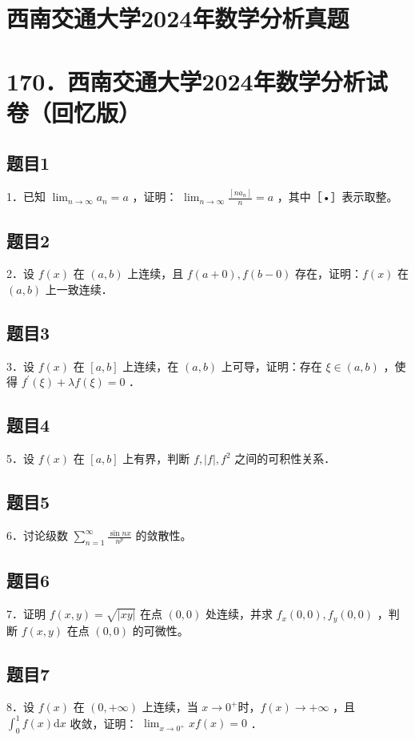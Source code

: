 \documentclass{article}
\begin{document}
\section*{西南交通大学2024年数学分析真题}
\section*{170．西南交通大学2024年数学分析试卷（回忆版）}

\subsection{题目1}
1．已知 \(\lim _{n \rightarrow \infty} a_{n}=a\) ，证明： \(\lim _{n \rightarrow \infty} \frac{\left[n a_{n}\right]}{n}=a\) ，其中［•］表示取整。

\subsection{题目2}
2．设 \(f(x)\) 在 \((a, b)\) 上连续，且 \(f(a+0), f(b-0)\) 存在，证明：\(f(x)\) 在 \((a, b)\) 上一致连续．

\subsection{题目3}
3．设 \(f(x)\) 在 \([a, b]\) 上连续，在 \((a, b)\) 上可导，证明：存在 \(\xi \in(a, b)\) ，使得 \(f^{\prime}(\xi)+\lambda f(\xi)=0\) ．

\subsection{题目4}
5．设 \(f(x)\) 在 \([a, b]\) 上有界，判断 \(f,|f|, f^{2}\) 之间的可积性关系．

\subsection{题目5}
6．讨论级数 \(\sum_{n=1}^{\infty} \frac{\sin n x}{n^{p}}\) 的敛散性。

\subsection{题目6}
7．证明 \(f(x, y)=\sqrt{|x y|}\) 在点 \((0,0)\) 处连续，并求 \(f_{x}(0,0), f_{y}(0,0)\) ，判断 \(f(x, y)\) 在点 \((0,0)\) 的可微性。

\subsection{题目7}
8．设 \(f(x)\) 在 \((0,+\infty)\) 上连续，当 \(x \rightarrow 0^{+}\)时，\(f(x) \rightarrow+\infty\) ，且 \(\int_{0}^{1} f(x) \mathrm{d} x\) 收敛，证明： \(\lim _{x \rightarrow 0^{+}} x f(x)=0\) ．
\end{document}
